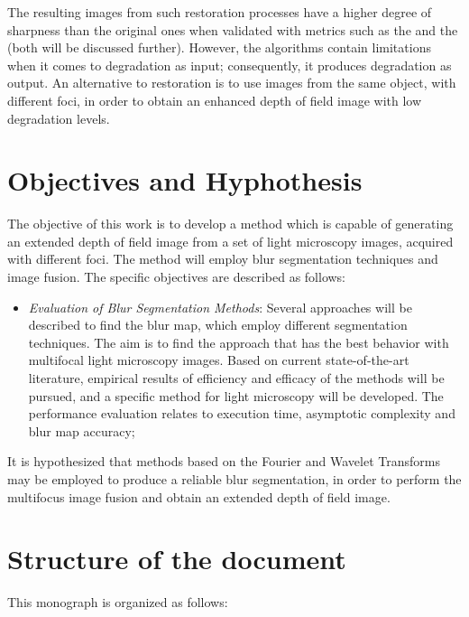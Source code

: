 The resulting images from such restoration processes have a higher degree of sharpness than the original ones when validated with metrics such as the  and the  (both will be discussed further). However, the algorithms contain limitations when it comes to degradation as input; consequently, it produces degradation as output. An alternative to restoration is to use images from the same object, with different foci, in order to obtain an enhanced depth of field image with low degradation levels.

\section{Objectives and Hyphothesis}

The objective of this work is to develop a method which is capable of generating an extended depth of field image from a set of light microscopy images, acquired with different foci. The method will employ blur segmentation techniques and image fusion. The specific objectives are described as follows:

\begin{itemize}
    \item \emph{Evaluation of Blur Segmentation Methods}: Several approaches will be described to find the blur map, which employ different segmentation techniques. The aim is to find the approach that has the best behavior with multifocal light microscopy images. Based on current state-of-the-art literature, empirical results of efficiency and efficacy of the methods will be pursued, and a specific method for light microscopy will be developed. The performance evaluation relates to execution time, asymptotic complexity and blur map accuracy;
    
    
\end{itemize}

It is hypothesized that methods based on the Fourier and Wavelet Transforms may be employed to produce a reliable blur segmentation, in order to perform the multifocus image fusion and obtain an extended depth of field image.

\section{Structure of the document}

This monograph is organized as follows:

